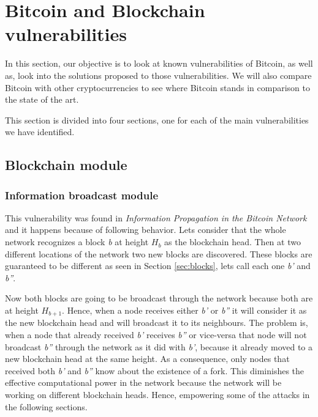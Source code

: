 


\section{Bitcoin and Blockchain vulnerabilities}
\label{sec:vulnerabilities}
In this section, our objective is to look at known vulnerabilities of Bitcoin, as well as, look into the solutions proposed to those vulnerabilities. We will also compare Bitcoin with other cryptocurrencies to see where Bitcoin stands in comparison to the state of the art.

This section is divided into four sections, one for each of the main vulnerabilities we have identified.

\subsection{Blockchain module}
\label{sec:b_module}

\subsubsection{Information broadcast module}
\label{sec:info_broad_module}

\label{sec:ieclipsing}
This vulnerability was found in \textit{Information Propagation in the Bitcoin Network} \cite{decker2013information} and it happens because of following behavior. Lets consider that the whole network recognizes a block \textit{b} at height $H_b$ as the blockchain head. Then at two different locations of the network two new blocks are discovered. These blocks are guaranteed to be different as seen in Section \ref{sec:blocks}, lets call each one \textit{b'} and \textit{b''}.

Now both blocks are going to be broadcast through the network because both are at height $H_{b+1}$. Hence, when a node receives either \textit{b'} or \textit{b''} it will consider it as the new blockchain head and will broadcast it to its neighbours. The problem is, when a node that already received \textit{b'} receives \textit{b''} or vice-versa that node will not broadcast \textit{b''} through the network as it did with \textit{b'}, because it already moved to a new blockchain head at the same height. As a consequence, only nodes that received both \textit{b'} and \textit{b''} know about the existence of a fork. This diminishes the effective computational power in the network because the network will be working on different blockchain heads. Hence, empowering some of the attacks in the following sections.

